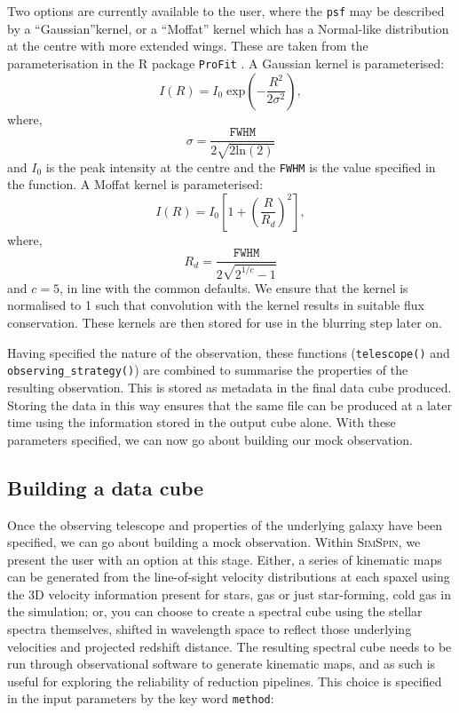 \documentclass[
  journal=pasa,
  manuscript=research-paper, %
  year=2020,
  volume=37,
]{cup-journal}
\newcommand{\simspin}[1]{\textsc{SimSpin}#1} %
\newcommand{\telescope}[1]{\texttt{telescope()}#1}
\newcommand{\observingstrategy}[1]{\texttt{observing\_strategy()}#1}
\begin{document}
Two options are currently available to the user, where the \texttt{psf} may be described by a ``Gaussian''kernel, or a ``Moffat'' kernel \citep{Moffat1969APhotometry} which has a Normal-like distribution at the centre with more extended wings. 
These are taken from the parameterisation in the \small{R} package \texttt{ProFit} \citep{Robotham2017ProFit:Images}. A Gaussian kernel is parameterised:
\begin{equation}
    I(R) = I_0 \; \text{exp}\left(- \frac{R^2}{2 \sigma^2}\right),
\end{equation}
where,
\begin{equation}
    \sigma = \frac{\texttt{FWHM}}{2 \sqrt{2\text{ln}(2)}}
\end{equation}
and $I_0$ is the peak intensity at the centre and the \texttt{FWHM} is the value specified in the function. A Moffat kernel is parameterised:
\begin{equation}
I(R) = I_0 \left[ 1 + \left(\frac{R}{R_d}\right)^2 \right],
\end{equation}
where,
\begin{equation}
    R_d = \frac{\texttt{FWHM}}{2\sqrt{2^{1/c} - 1}}
\end{equation}
and $c = 5$, in line with the common defaults.
We ensure that the kernel is normalised to 1 such that convolution with the kernel results in suitable flux conservation.
These kernels are then stored for use in the blurring step later on. 

\vspace{0.5cm}

Having specified the nature of the observation, these functions (\telescope{} and \observingstrategy) are combined to summarise the properties of the resulting observation. 
This is stored as metadata in the final data cube produced.
Storing the data in this way ensures that the same file can be produced at a later time using the information stored in the output cube alone. 
With these parameters specified, we can now go about building our mock observation. 

\subsection{Building a data cube}

Once the observing telescope and properties of the underlying galaxy have been specified, we can go about building a mock observation. 
Within \simspin, we present the user with an option at this stage. 
Either, a series of kinematic maps can be generated from the line-of-sight velocity distributions at each spaxel using the 3D velocity information present for stars, gas or just star-forming, cold gas in the simulation; or, you can choose to create a spectral cube using the stellar spectra themselves, shifted in wavelength space to reflect those underlying velocities and projected redshift distance. 
The resulting spectral cube needs to be run through observational software to generate kinematic maps, and as such is useful for exploring the reliability of reduction pipelines.
This choice is specified in the input parameters by the key word \texttt{method}:
\end{document}
